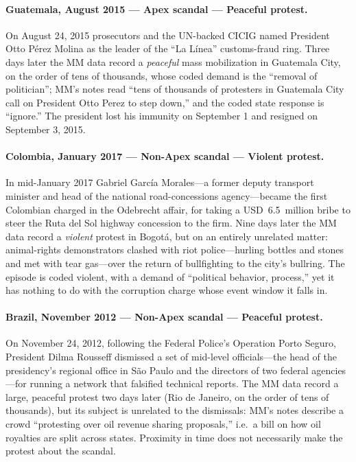 \documentclass[11pt]{article}
\begin{document}
\paragraph{Guatemala, August 2015 --- Apex scandal --- Peaceful protest.} On August 24, 2015 prosecutors and the UN-backed CICIG named President Otto P\'erez Molina as the leader of the ``La L\'inea'' customs-fraud ring. Three days later the MM data record a \emph{peaceful} mass mobilization in Guatemala City, on the order of tens of thousands, whose coded demand is the ``removal of politician''; MM's notes read ``tens of thousands of protesters in Guatemala City call on President Otto Perez to step down,'' and the coded state response is ``ignore.'' The president lost his immunity on September 1 and resigned on September 3, 2015.

\paragraph{Colombia, January 2017 --- Non-Apex scandal --- Violent protest.} In mid-January 2017 Gabriel Garc\'ia Morales---a former deputy transport minister and head of the national road-concessions agency---became the first Colombian charged in the Odebrecht affair, for taking a USD~6.5~million bribe to steer the Ruta del Sol highway concession to the firm. Nine days later the MM data record a \emph{violent} protest in Bogot\'a, but on an entirely unrelated matter: animal-rights demonstrators clashed with riot police---hurling bottles and stones and met with tear gas---over the return of bullfighting to the city's bullring. The episode is coded violent, with a demand of ``political behavior, process,'' yet it has nothing to do with the corruption charge whose event window it falls in.

\paragraph{Brazil, November 2012 --- Non-Apex scandal --- Peaceful protest.} On November 24, 2012, following the Federal Police's Operation Porto Seguro, President Dilma Rousseff dismissed a set of mid-level officials---the head of the presidency's regional office in S\~ao Paulo and the directors of two federal agencies---for running a network that falsified technical reports. The MM data record a large, peaceful protest two days later (Rio de Janeiro, on the order of tens of thousands), but its subject is unrelated to the dismissals: MM's notes describe a crowd ``protesting over oil revenue sharing proposals,'' i.e.\ a bill on how oil royalties are split across states. Proximity in time does not necessarily make the protest about the scandal.
\end{document}

